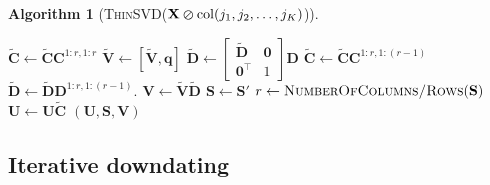 \documentclass[11pt,a4paper]{article}
\theoremstyle{break}
\newtheorem*{algorithm}{Algorithm}
\numberwithin{dummy}{section}
\theoremstyle{plain}
\theoremstyle{plain}
\theoremstyle{plain}
\theoremstyle{plain}
\theoremstyle{plain}
\theoremstyle{MyNonumberplain}
\newcommand{\0}{\M{0}}
\newcommand{\M}[1]{\mathbf{#1}}
\newcommand{\Mt}[1]{\tilde{\M{#1}}}
\newcommand{\T}{\top}
\newcommand{\ve}[1]{\mathbf{#1}}
\newcommand{\delrow}[2]{\M{#1} \varominus \mathrm{row}(#2)}
\newcommand{\zercol}[2]{\M{#1} \varoslash \mathrm{col}(#2)}
\begin{document}
\begin{algorithm}[\textnormal{\textsc{ThinSVD}(\unboldmath$\zercol{X}{j_1,j_2, \dots, j_K}$)}]
\begin{algorithmic}[1]
    \If {$\ve{q} \neq \0$}
    \State
    \begin{math}
      \Mt{C}
      \gets
      \Mt{C}  \M{C}^{1:r, 1:r}
    \end{math}
    \State
    \begin{math}
      \Mt{V} \gets [\Mt{V}, \ve{q}]
    \end{math}
    \State
    \begin{math}
      \Mt{D}
      \gets
      \begin{bmatrix}
        \Mt{D} & \0
        \\
        \0^\T & 1
      \end{bmatrix}
      \M{D}
    \end{math}
    \Else
    \State
    \begin{math}
      \Mt{C}
      \gets
      \Mt{C}  \M{C}^{1:r, 1:(r-1)}
    \end{math}
    \State
    \begin{math}
      \Mt{D}
      \gets
      \Mt{D} \M{D}^{1:r, 1:(r-1)}.
    \end{math}
    \EndIf
    \State
    \begin{math}
      \M{V} \gets \Mt{V} \Mt{D}
    \end{math}
    \State
    \begin{math}
      \M{S} \gets \M{S}'
    \end{math}
    \State
    \begin{math}
      r \gets \textsc{NumberOfColumns/Rows}(\M{S})
    \end{math}
    \EndFor
   \State
    \begin{math}
      \M{U} \gets \M{U} \Mt{C}
    \end{math}
    \State
    \Return $(\M{U}, \M{S}, \M{V})$
  \end{algorithmic}
\end{algorithm}



\subsection{Iterative downdating}
\label{sec:iterative-downdating}
\end{document}
